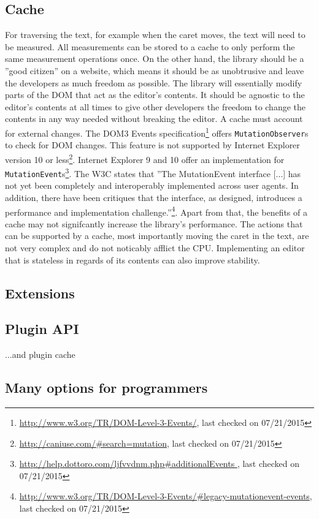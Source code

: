 \subsection{Cache} For traversing the text, for example when the caret moves, the text will need to be measured. All measurements can be stored to a cache to only perform the same measurement operations once. On the other hand, the library should be a ''good citizen'' on a website, which means it should be as unobtrusive and leave the developers as much freedom as possible. The library will essentially modify parts of the DOM that act as the editor's contents. It should be agnostic to the editor's contents at all times to give other developers the freedom to change the contents in any way needed without breaking the editor. A cache must account for external changes. The DOM3 Events specification\footnote{\url{http://www.w3.org/TR/DOM-Level-3-Events/}, last checked on 07/21/2015} offers \texttt{MutationObserver}s to check for DOM changes. This feature is not supported by Internet Explorer version 10 or less\footnote{\url{http://caniuse.com/\#search=mutation}, last checked on 07/21/2015}. Internet Explorer 9 and 10 offer an implementation for \texttt{MutationEvent}s\footnote{\url{http://help.dottoro.com/ljfvvdnm.php\#additionalEvents }, last checked on 07/21/2015}. The W3C states that ''The MutationEvent interface [...] has not yet been completely and interoperably implemented across user agents. In addition, there have been critiques that the interface, as designed, introduces a performance and implementation challenge.''\footnote{\url{http://www.w3.org/TR/DOM-Level-3-Events/\#legacy-mutationevent-events}, last checked on 07/21/2015}. Apart from that, the benefits of a cache may not signifcantly increase the library's performance. The actions that can be supported by a cache, most importantly moving the caret in the text, are not very complex and do not noticably afflict the CPU. Implementing an editor that is stateless in regards of its contents can also improve stability.

\subsection{Extensions}

\subsection{Plugin API} ...and plugin cache

\subsection{Many options for programmers}

